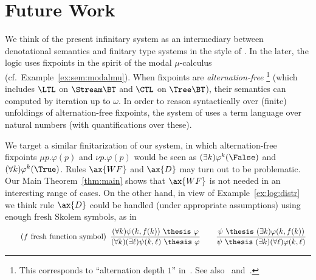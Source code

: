 \section{Future Work}
\label{sec:conc}

We think of the present infinitary system as an intermediary
between denotational semantics and finitary type systems
in the style of \cite{jr21esop}.
In the later,
the logic uses fixpoints in the spirit of the modal $\mu$-calculus
(cf.\ Example~\ref{ex:sem:modalmu}).
When fixpoints are \emph{alternation-free}%
\footnote{This corresponds to
``alternation depth $1$'' in~\cite[\S 2.2 \& \S 4.1]{bw18chapter}.
See also~\cite[\S 7]{bs07chapter} and~\cite{sv10apal}.}
(which includes $\LTL$ on $\Stream\BT$ and $\CTL$ on $\Tree \BT$),
their semantics can computed by iteration up to $\omega$.
In order to reason syntactically over (finite) unfoldings of alternation-free fixpoints,
the system of \cite{jr21esop} uses a term language over natural
numbers (with quantifications over these).

We target a similar finitarization of our system,
in which alternation-free fixpoints $\mu p.\varphi(p)$
and $\nu p.\varphi(p)$ would be seen as
$(\exists k)\varphi^k(\False)$ and $(\forall k)\varphi^k(\True)$.
Rules $\ax{WF}$ and $\ax{D}$ may turn out to be problematic.
Our Main Theorem~\ref{thm:main} shows that $\ax{WF}$
is not needed in an interesting range of cases.
On the other hand, in view of Example~\ref{ex:log:distr}
we think rule $\ax{D}$ could be handled (under appropriate assumptions)
using enough fresh Skolem symbols, as in
\[
\tag{$f$ fresh function symbol}
\begin{array}{c}
\dfrac{(\forall k)\psi(k,f(k)) ~\thesis~ \varphi}
  {(\forall k)(\exists \ell)\psi(k,\ell) ~\thesis~ \varphi}

\qquad

\dfrac{\psi ~\thesis~ (\exists k)\varphi(k,f(k))}
  {\psi ~\thesis~ (\exists k)(\forall \ell)\varphi(k,\ell)}

\end{array}
\]


